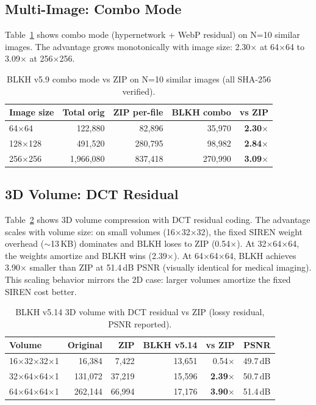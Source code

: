 \documentclass[11pt,a4paper]{article}
\begin{document}
\subsection{Multi-Image: Combo Mode}

Table~\ref{tab:combo_scaling} shows combo mode (hypernetwork + WebP residual) on N=10 similar images. The advantage grows monotonically with image size: 2.30$\times$ at 64$\times$64 to 3.09$\times$ at 256$\times$256.

\begin{table}[t]
\centering
\caption{BLKH v5.9 combo mode vs ZIP on N=10 similar images (all SHA-256 verified).}
\label{tab:combo_scaling}
\begin{tabular}{lrrrr}
\toprule
Image size & Total orig & ZIP per-file & BLKH combo & vs ZIP \\
\midrule
64$\times$64 & 122,880 & 82,896 & 35,970 & \textbf{2.30$\times$} \\
128$\times$128 & 491,520 & 280,795 & 98,982 & \textbf{2.84$\times$} \\
256$\times$256 & 1,966,080 & 837,418 & 270,990 & \textbf{3.09$\times$} \\
\bottomrule
\end{tabular}
\end{table}

\subsection{3D Volume: DCT Residual}

Table~\ref{tab:volume_dct} shows 3D volume compression with DCT residual coding. The advantage scales with volume size: on small volumes (16$\times$32$\times$32), the fixed SIREN weight overhead ($\sim$13\,KB) dominates and BLKH loses to ZIP (0.54$\times$). At 32$\times$64$\times$64, the weights amortize and BLKH wins (2.39$\times$). At 64$\times$64$\times$64, BLKH achieves 3.90$\times$ smaller than ZIP at 51.4\,dB PSNR (visually identical for medical imaging). This scaling behavior mirrors the 2D case: larger volumes amortize the fixed SIREN cost better.

\begin{table}[t]
\centering
\caption{BLKH v5.14 3D volume with DCT residual vs ZIP (lossy residual, PSNR reported).}
\label{tab:volume_dct}
\begin{tabular}{lrrrrr}
\toprule
Volume & Original & ZIP & BLKH v5.14 & vs ZIP & PSNR \\
\midrule
16$\times$32$\times$32$\times$1 & 16,384 & 7,422 & 13,651 & 0.54$\times$ & 49.7\,dB \\
32$\times$64$\times$64$\times$1 & 131,072 & 37,219 & 15,596 & \textbf{2.39$\times$} & 50.7\,dB \\
64$\times$64$\times$64$\times$1 & 262,144 & 66,994 & 17,176 & \textbf{3.90$\times$} & 51.4\,dB \\
\bottomrule
\end{tabular}
\end{table}
\end{document}
